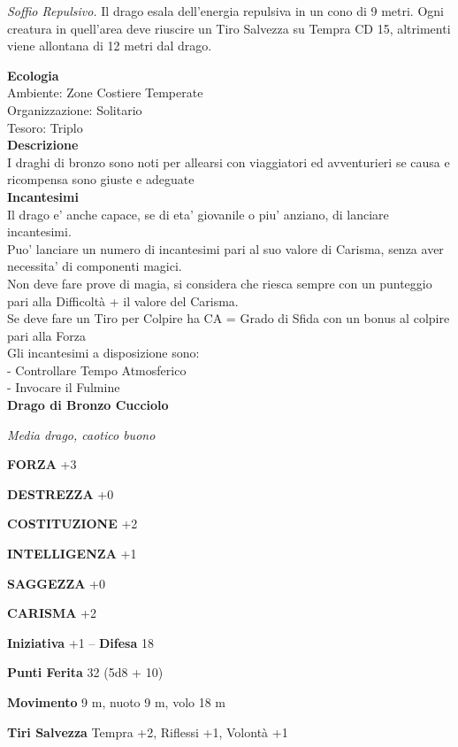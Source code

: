 \begin{multicols}{2}
\emph{Soffio Repulsivo.} Il drago esala dell'energia repulsiva in un cono di 9 metri. Ogni creatura in quell'area deve riuscire un Tiro Salvezza su Tempra CD 15, altrimenti viene allontana di 12 metri dal drago.

\textbf{Ecologia}\\
Ambiente: Zone Costiere Temperate\\
Organizzazione: Solitario\\
Tesoro: Triplo\\
\textbf{Descrizione}\\
I draghi di bronzo sono noti per allearsi con viaggiatori ed avventurieri se causa e ricompensa sono giuste e adeguate\\
\textbf{Incantesimi}\\
Il drago e' anche capace, se di eta' giovanile o piu' anziano, di lanciare incantesimi.\\
Puo' lanciare un numero di incantesimi pari al suo valore di Carisma, senza aver necessita' di componenti magici.\\
Non deve fare prove di magia, si considera che riesca sempre con un punteggio pari alla Difficoltà + il valore del Carisma.\\
Se deve fare un Tiro per Colpire ha CA = Grado di Sfida con un bonus al colpire pari alla Forza\\
Gli incantesimi a disposizione sono:\\
- Controllare Tempo Atmosferico\\
- Invocare il Fulmine\\


\medskip{}\textbf{Drago di Bronzo Cucciolo}

\emph{Media drago, caotico buono}

\textbf{FORZA} +3

\textbf{DESTREZZA} +0

\textbf{COSTITUZIONE} +2

\textbf{INTELLIGENZA} +1

\textbf{SAGGEZZA} +0

\textbf{CARISMA} +2

\textbf{Iniziativa} +1 -- \textbf{Difesa} 18

\textbf{Punti Ferita} 32 (5d8 + 10)

\textbf{Movimento} 9 m, nuoto 9 m, volo 18 m

\textbf{Tiri Salvezza} Tempra +2, Riflessi +1, Volontà +1


\end{multicols}
